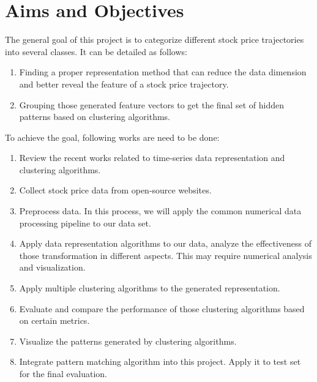\section{Aims and Objectives}

The general goal of this project is to categorize different stock price trajectories into several classes. It can be detailed as follows:
\begin{enumerate}
    \item Finding a proper representation method that can reduce the data dimension and better reveal the feature of a stock price trajectory.
    \item Grouping those generated feature vectors to get the final set of hidden patterns based on clustering algorithms.
\end{enumerate}
To achieve the goal, following works are need to be done:
\begin{enumerate}
    \item Review the recent works related to time-series data representation and clustering algorithms.
    \item Collect stock price data from open-source websites. 
    \item Preprocess data. In this process, we will apply the common numerical data processing pipeline to our data set.
    \item Apply data representation algorithms to our data, analyze the effectiveness of those transformation in different aspects. This may require numerical analysis and visualization.
    \item Apply multiple clustering algorithms to the generated representation.
    \item Evaluate and compare the performance of those clustering algorithms based on certain metrics.
    \item Visualize the patterns generated by clustering algorithms.
    \item Integrate pattern matching algorithm into this project. Apply it to test set for the final evaluation.
\end{enumerate}



